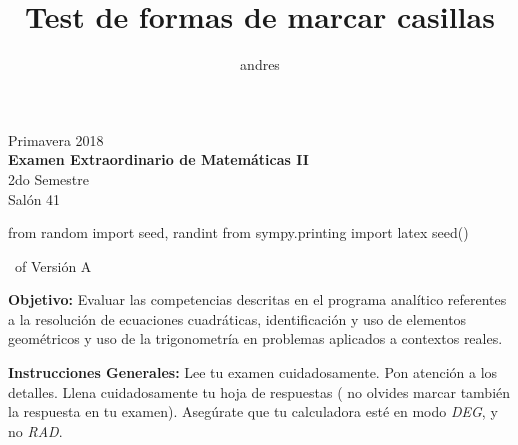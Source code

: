 \documentclass[a4paper]{article}
\title{Test de formas de marcar casillas}
\author{andres}
\begin{document}
\begin{center}
Primavera 2018 \\
\textbf{Examen Extraordinario de Matemáticas II } \\
2do Semestre \\
Salón 41
\end{center}
\extraheadheight{-0.5in}

\begin{runsilent}
from random import seed, randint
from sympy.printing import latex
seed(\seed)
\end{runsilent}


\runningheadrule \extraheadheight{0.1in}


\runningheadrule \extraheadheight{0.14in}


              {\thepage\ of \numpages}
              {Versión A}


\nopointsinmargin
\setlength\linefillthickness{0.1pt}
\setlength\answerlinelength{0.1in}
\vspace{0.25in}
\parbox{6in}{
\textbf{Objetivo:} Evaluar las competencias descritas en el programa analítico referentes a la resolución de ecuaciones cuadráticas, identificación y uso de elementos geométricos y uso de la trigonometría en problemas aplicados a contextos reales. }


\parbox{6in}{{\textbf{Instrucciones Generales:} Lee tu examen cuidadosamente. Pon atención a los detalles. Llena cuidadosamente tu hoja de respuestas ( no olvides marcar también la respuesta en tu examen). Asegúrate que tu calculadora esté en modo \textit{DEG}, y no \textit{RAD}. }
}

 \begin{center}
\vspace{0.2in}
\end{center}
\end{document}
